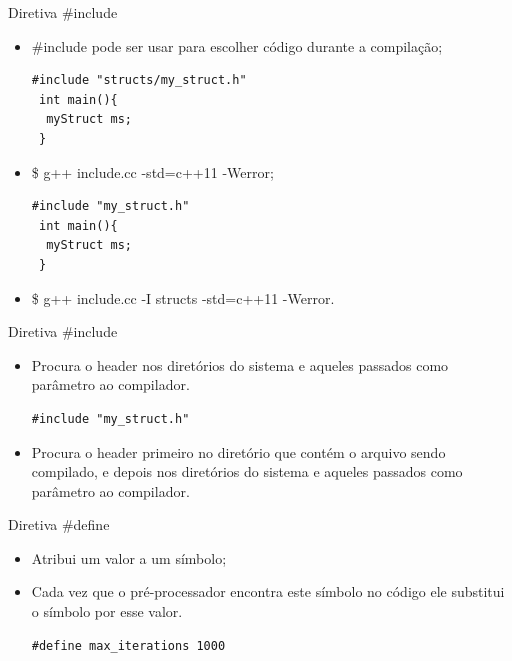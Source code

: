 \documentclass[12pt,table,xcolor={dvipsnames}]{beamer}
\begin{document}
\begin{frame}[fragile]{Diretiva \#include}
\begin{itemize}
\item \#include pode ser usar para escolher código durante a compilação;
\begin{lstlisting}
#include "structs/my_struct.h"
 int main(){
  myStruct ms;
 }
\end{lstlisting}
\item \$ g++ include.cc -std=c++11 -Werror;
\begin{lstlisting}
#include "my_struct.h"
 int main(){
  myStruct ms;
 }
\end{lstlisting}
\item \$ g++ include.cc -I structs -std=c++11 -Werror.
\end{itemize}
\end{frame}

\begin{frame}[fragile]{Diretiva \#include}
\begin{itemize}
\begin{lstlisting}
#include <list>
\end{lstlisting}
\item Procura o header nos diretórios do sistema e aqueles passados como parâmetro ao compilador.
\\
\begin{lstlisting}
#include "my_struct.h"
\end{lstlisting}
\item Procura o header primeiro no diretório que contém o arquivo sendo compilado, e depois nos diretórios do sistema e aqueles passados como parâmetro ao compilador.
\end{itemize}
\end{frame}

\begin{frame}[fragile]{Diretiva \#define}
\begin{itemize}
\item Atribui um valor a um símbolo;
\item Cada vez que o pré-processador encontra este símbolo no código ele substitui o símbolo por esse valor.
\begin{lstlisting}
#define max_iterations 1000	
\end{lstlisting}
\end{itemize}
\end{frame}
\end{document}
